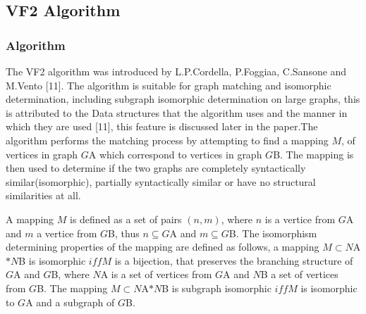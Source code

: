 \newpage

 \subsection{VF2 Algorithm}
\label{VF2 Algorithm}

\subsubsection{Algorithm}

 The VF2 algorithm was introduced by L.P.Cordella, P.Foggiaa, C.Sansone and M.Vento [11]. The algorithm is suitable for graph matching and isomorphic determination, including subgraph isomorphic determination on large graphs, this is attributed to the Data structures that the algorithm uses and the manner in which they are used [11], this feature is discussed later in the paper.\newline\newline The algorithm performs the matching process by attempting to find a mapping $M$, of vertices in graph $G${\tiny A} which correspond to vertices in graph $G${\tiny B}. The mapping is then used to determine if the two graphs are completely syntactically similar(isomorphic), partially syntactically similar or have no structural similarities at all.

A mapping $M$ is defined as a set of pairs $(n,m)$, where $n$ is a vertice from $G${\tiny A} and $m$ a vertice from $G${\tiny B}, thus $n \subseteq G${\tiny A} and $m \subseteq G${\tiny B}.\newline\newline
The isomorphism determining properties of the mapping are defined as follows, a mapping $M \subset N${\tiny A} $ * N${\tiny B} is isomorphic $iff M$ is a bijection, that preserves the branching structure of $G${\tiny A} and $G${\tiny B}, where $N${\tiny A} is a set of vertices from $G${\tiny A} and $N${\tiny B} a set of vertices from $G${\tiny B}.\newline\newline
The mapping $M \subset N${\tiny A}$ * N${\tiny B} is subgraph isomorphic $iff M$ is isomorphic to $G${\tiny A} and a subgraph of $G${\tiny B}.

